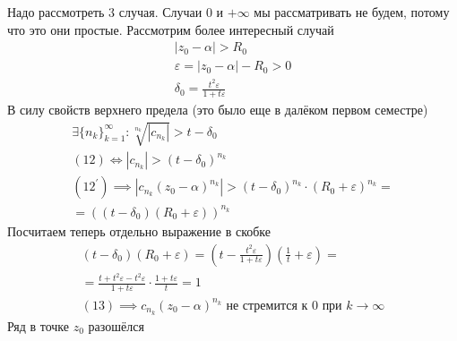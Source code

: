 \documentclass[main]{subfiles}
\begin{document}
\begin{longProof}
    Надо рассмотреть 3 случая. Случаи $0$ и $+\infty$ мы рассматривать не будем, потому что это они простые. Рассмотрим
    более интересный случай
    \begin{gather*}
        |z_0 - \alpha| > R_0 \tag{10} \\
        \varepsilon = |z_0 - \alpha| - R_0 > 0 \\
        \delta_0 = \frac{t^2 \varepsilon}{1+t\varepsilon} \tag{11}
    \end{gather*}
    В силу свойств верхнего предела (это было еще в далёком первом семестре)
    \begin{gather*}
        \exists \{ n_k \}^\infty_{k=1} : \sqrt[n_k]{|c_{n_k}|} > t - \delta_0 \tag{12} \\
        (12) \Leftrightarrow |c_{n_k}| > (t-\delta_0)^{n_k} \tag{12\prime} \\
        (12^\prime) \implies |c_{n_k} (z_0-\alpha)^{n_k} | > (t-\delta_0)^{n_k} \cdot (R_0 + \varepsilon)^{n_k} = \\
       = ((t-\delta_0)(R_0 + \varepsilon))^{n_k}
    \end{gather*}
    Посчитаем теперь отдельно выражение в скобке
    \begin{multline*}
        (t-\delta_0)(R_0+ \varepsilon) =  \left (t- \frac{t^2\varepsilon}{1+t\varepsilon}\right ) \left (\frac{1}{t} + \varepsilon  \right ) = \\
        = \frac{t+t^2\varepsilon-t^2\varepsilon}{1+t\varepsilon} \cdot \frac{1 + t \varepsilon}{t} = 1\\
        (13) \implies c_{n_k} (z_0 - \alpha)^{n_k} \text{ не стремится к 0 при } k \to \infty
    \end{multline*}
    Ряд в точке $z_0$ разошёлся


\end{longProof}
\end{document}
